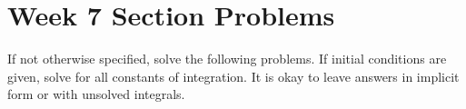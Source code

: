 \documentclass[letterpaper, fontsize=11pt]{scrartcl} %
\numberwithin{equation}{section} %
\numberwithin{figure}{section} %
\numberwithin{table}{section} %
\begin{document}

\newcommand{\horrule}[1]{\rule{\linewidth}{#1}} %


\section*{Week 7 Section Problems}
\par If not otherwise specified, solve the following problems. If initial conditions are given, solve for all constants of integration. It is okay to leave answers in implicit form or with unsolved integrals. 
\end{document}
